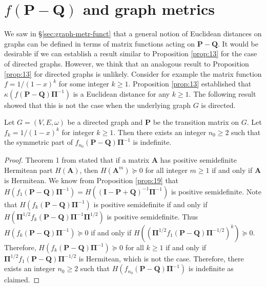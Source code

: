 \section{$f(\mathbf{P} - \mathbf{Q})$ and graph metrics}
\label{sec:fmathbfp-mathbfq-gra}
We saw in \S \ref{sec:graph-metr-funct} that a general notion of
Euclidean distances on graphs can be defined in terms of matrix
functions acting on $\mathbf{P} - \mathbf{Q}$. It would be desirable
if we can establish a result similar to Proposition \ref{prop:13}
for the case of directed graphs. However, we think that an analogous
result to Proposition \ref{prop:13} for directed graphs is
unlikely. Consider for example the matrix function $f = 1/(1-x)^{k}$
for some integer $k \geq 1$. Proposition \ref{prop:13} established
that $\kappa(f(\mathbf{P} - \mathbf{Q})\bm{\Pi}^{-1})$ is a
Euclidean distance for any $k \geq 1$.  The following result showed
that this is not the case when the underlying graph $G$ is directed.
\begin{proposition}
  \label{prop:25}
  Let $G = (V,E,\omega)$ be a directed graph and $\mathbf{P}$ be the transition
  matrix on $G$. Let $f_k = 1/(1-x)^{k}$ for integer $k \geq 1$. Then
  there exists an integer $n_0 \geq 2$ such that the symmetric part of
  $f_{n_0}(\mathbf{P} - \mathbf{Q})\bm{\Pi}^{-1}$ is indefinite. 
\end{proposition}
\begin{proof}
  Theorem 1 from \citet{johnson75:_power_matric_posit_defin_real_part}
  stated that if a matrix $\mathbf{A}$ has positive semidefinite
  Hermitean part $H(\mathbf{A})$, then $H(\mathbf{A}^{m}) \succeq 0$ for all
  integer $m \geq 1$ if and only if $\mathbf{A}$ is Hermitean. We know
  from Proposition \ref{prop:19} that $H(f_1(\mathbf{P} -
  \mathbf{Q})\bm{\Pi}^{-1}) = H((\mathbf{I} - \mathbf{P} +
  \mathbf{Q})^{-1}\bm{\Pi}^{-1})$ is positive semidefinite. Note that
  $H(f_{k}(\mathbf{P} - \mathbf{Q})\bm{\Pi}^{-1})$ is positive
  semidefinite if and only if $H(\bm{\Pi}^{1/2}f_{k}(\mathbf{P} -
  \mathbf{Q}) \bm{\Pi}^{-1} \bm{\Pi}^{1/2})$ is positive
  semidefinite. Thus $H(f_{k}(\mathbf{P} - \mathbf{Q})\bm{\Pi}^{-1})
  \succeq 0$ if and only if $H((\bm{\Pi}^{1/2}f_{1}(\mathbf{P} -
  \mathbf{Q})\bm{\Pi}^{-1/2})^{k}) \succeq 0$. Therefore,
  $H(f_{k}(\mathbf{P} - \mathbf{Q})\bm{\Pi}^{-1}) \succeq 0$ for all
  $k \geq 1$ if and only if $\bm{\Pi}^{1/2}f_{1}(\mathbf{P} -
  \mathbf{Q})\bm{\Pi}^{-1/2}$ is Hermitean, which is not the
  case. Therefore, there exists an integer $n_0 \geq 2$ such that
  $H(f_{n_0}(\mathbf{P} - \mathbf{Q})\bm{\Pi}^{-1})$ is indefinite as
  claimed.
\end{proof}

